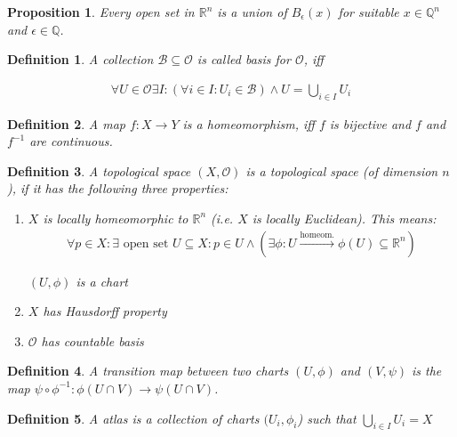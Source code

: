 \documentclass{scrartcl}
\newcommand{\R}{\mathbb R}
\newcommand{\Q}{\mathbb Q}
\newtheorem*{mydef}{Definition}
\newtheorem*{prop}{Proposition}
\begin{document}
\begin{prop}
  Every open set in $\R^n$ is a union of $B_\epsilon(x)$ for suitable $x\in \Q^n$ and $\epsilon\in \Q$.
\end{prop}

\begin{mydef}
  A collection $\mathcal B\subseteq \mathcal O$ is called \emph{basis} for $\mathcal O$, iff

  \begin{align}
    \forall U \in \mathcal O \exists I: \left(\forall i \in I: U_i \in \mathcal B\right) \land U = \bigcup_{i\in I} U_i
  \end{align}
\end{mydef}

\begin{mydef}
  A map $f:X\rightarrow Y$ is a \emph{homeomorphism}, iff $f$ is bijective and $f$ and $f^{-1}$ are continuous.
\end{mydef}

\begin{mydef}
  A topological space $(X,\mathcal O)$ is a \emph{topological space} (of dimension $n$), if it has the following three properties:

  \begin{enumerate}
  \item $X$ is locally homeomorphic to $\R^n$ (i.e. $X$ is locally Euclidean). This means:
    \begin{align}
      \forall p \in X: \exists \text{ open set } U \subseteq X: p\in U \land \left( \exists \phi: U \stackrel{\text{homeom.}}\longrightarrow \phi(U) \subseteq \R^n\right)
    \end{align}

    $(U,\phi)$ is a \emph{chart}
  \item $X$ has Hausdorff property
  \item $\mathcal O$ has countable basis
  \end{enumerate}
\end{mydef}

\begin{mydef}
  A \emph{transition map} between two charts $(U,\phi)$ and $(V,\psi)$ is the map $\psi\circ \phi^{-1}:\phi(U\cap V) \rightarrow \psi(U\cap V)$.
\end{mydef}

\begin{mydef}
  A \emph{atlas} is a collection of charts $(U_i,\phi_i$) such that $\bigcup_{i\in I} U_i=X$
\end{mydef}
\end{document}
